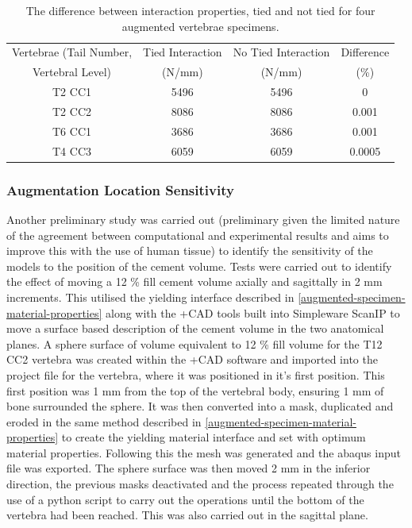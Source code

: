 \begin{table}[ht!]

\caption{The difference between interaction properties, tied and not tied for
four augmented vertebrae specimens.}
\label{tab:meshint}
\centering
  \begin{tabular}{c|c|c|c}
Vertebrae (Tail Number,  & Tied Interaction  & No Tied Interaction  &
Difference \\
Vertebral Level) & (N/mm) & (N/mm) & (\%) \\
\hline
\hline

T2 CC1 &	 5496 &	 5496 &	 0\\
T2 CC2 &	 8086 &	 8086 &	 0.001\\
T6 CC1 &	 3686 &	 3686 &	 0.001\\
T4 CC3 &	 6059 &	 6059 &	 0.0005\\ \hline

\end{tabular}
\end{table}



\subsubsection{Augmentation Location Sensitivity}

Another preliminary study was carried out (preliminary given the limited nature
of the agreement between computational and experimental results and aims to
improve this with the use of human tissue) to identify the sensitivity of the
models to the position of the cement volume.  Tests were carried out to
identify the effect of moving a 12 \% fill cement volume axially and sagittally
in 2 mm increments.  This utilised the yielding interface described in
\cref{augmented-specimen-material-properties} along with the +CAD tools built
into Simpleware ScanIP to move a surface based description of the cement volume
in the two anatomical planes.  A sphere surface of volume equivalent to 12 \%
fill volume for the T12 CC2 vertebra was created within the +CAD software and
imported into the project file for the vertebra, where it was positioned in
it's first position.  This first position was 1 mm from the top of the
vertebral body, ensuring 1 mm of bone surrounded the sphere.  It was then
converted into a mask, duplicated and eroded in the same method described in
\cref{augmented-specimen-material-properties} to create the yielding material
interface and set with optimum material properties.  Following this the mesh
was generated and the abaqus input file was exported.  The sphere surface was
then moved 2 mm in the inferior direction, the previous masks deactivated and
the process repeated through the use of a python script to carry out the
operations until the bottom of the vertebra had been reached.  This was also
carried out in the sagittal plane. 


